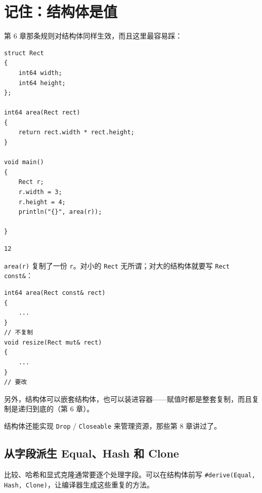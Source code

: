 \section{记住：结构体是值}

第 6 章那条规则对结构体同样生效，而且这里最容易踩：

\par
\medskip
\begin{lstlisting}[style=chali]
struct Rect
{
    int64 width;
    int64 height;
};

int64 area(Rect rect)
{
    return rect.width * rect.height;
}

void main()
{
    Rect r;
    r.width = 3;
    r.height = 4;
    println("{}", area(r));

}
\end{lstlisting}
\par
\medskip

\par
\medskip
\begin{lstlisting}[style=out]
12
\end{lstlisting}
\par
\medskip

\texttt{area(\allowbreak{}r)\allowbreak{}} 复制了一份 \texttt{r}。对小的 \texttt{Rect} 无所谓；对大的结构体就要写 \texttt{Rect const\&}：

\par
\medskip
\begin{lstlisting}[style=chali]
int64 area(Rect const& rect)
{
    ...
}
// 不复制
void resize(Rect mut& rect)
{
    ...
}
// 要改
\end{lstlisting}
\par
\medskip

另外，结构体可以嵌套结构体，也可以装进容器——赋值时都是整套复制，而且复制是递归到底的（第 6 章）。

结构体还能实现 \texttt{Drop} / \texttt{Closeable} 来管理资源，那些第 8 章讲过了。

\subsection*{从字段派生 Equal、Hash 和 Clone}

比较、哈希和显式克隆通常要逐个处理字段。可以在结构体前写 \texttt{\#derive(\allowbreak{}Equal,\allowbreak{} Hash,\allowbreak{} Clone)\allowbreak{}}，让编译器生成这些重复的方法。

